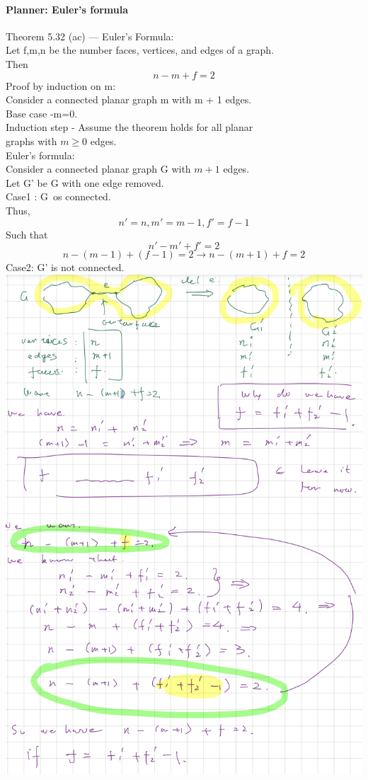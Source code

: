 \documentclass{article}
\begin{document}
\paragraph{Planner: Euler's formula}
Theorem 5.32 (ac) — Euler’s Formula:\\
Let f,m,n be the number faces, vertices, and edges of a graph.\\
Then $$n-m+f=2$$
Proof by induction on m:\\
Consider a connected planar graph m with m + 1 edges.\\
Base case -m=0.\\
Induction step - Assume the theorem holds for all planar\\
graphs with $m\ge 0$ edges.\\
Euler's formula:\\
Consider a connected planar graph G with $m+1$ edges.\\
Let G' be G with one edge removed.\\
Case1 : G\ os connected.\\
Thus, $$n'=n,m'=m-1,f'=f-1$$
Such that$$n'-m'+f'=2$$
$$n-(m-1)+(f-1)=2\longrightarrow n-(m+1)+f=2$$
Case2: G' is not connected.\\
\includegraphics{0103}
\end{document}
